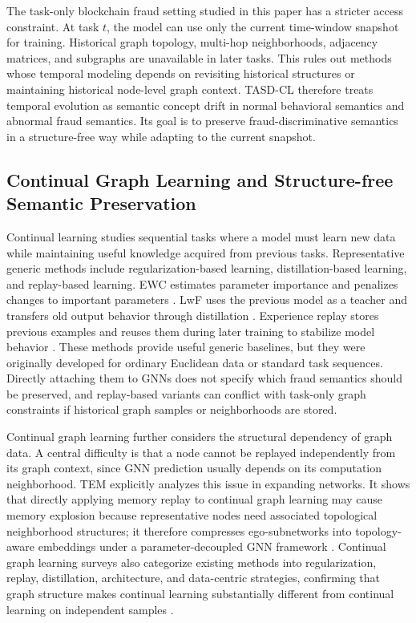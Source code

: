 The task-only blockchain fraud setting studied in this paper has a stricter access constraint. At task $t$, the model can use only the current time-window snapshot for training. Historical graph topology, multi-hop neighborhoods, adjacency matrices, and subgraphs are unavailable in later tasks. This rules out methods whose temporal modeling depends on revisiting historical structures or maintaining historical node-level graph context. TASD-CL therefore treats temporal evolution as semantic concept drift in normal behavioral semantics and abnormal fraud semantics. Its goal is to preserve fraud-discriminative semantics in a structure-free way while adapting to the current snapshot.

\subsection{Continual Graph Learning and Structure-free Semantic Preservation}
\label{subsec:rw-cgl}

Continual learning studies sequential tasks where a model must learn new data while maintaining useful knowledge acquired from previous tasks. Representative generic methods include regularization-based learning, distillation-based learning, and replay-based learning. EWC estimates parameter importance and penalizes changes to important parameters \cite{kirkpatrick2017ewc}. LwF uses the previous model as a teacher and transfers old output behavior through distillation \cite{li2017lwf}. Experience replay stores previous examples and reuses them during later training to stabilize model behavior \cite{robins1995catastrophic}. These methods provide useful generic baselines, but they were originally developed for ordinary Euclidean data or standard task sequences. Directly attaching them to GNNs does not specify which fraud semantics should be preserved, and replay-based variants can conflict with task-only graph constraints if historical graph samples or neighborhoods are stored.

Continual graph learning further considers the structural dependency of graph data. A central difficulty is that a node cannot be replayed independently from its graph context, since GNN prediction usually depends on its computation neighborhood. TEM explicitly analyzes this issue in expanding networks. It shows that directly applying memory replay to continual graph learning may cause memory explosion because representative nodes need associated topological neighborhood structures; it therefore compresses ego-subnetworks into topology-aware embeddings under a parameter-decoupled GNN framework \cite{zhang2024tem}. Continual graph learning surveys also categorize existing methods into regularization, replay, distillation, architecture, and data-centric strategies, confirming that graph structure makes continual learning substantially different from continual learning on independent samples \cite{wang2024cglsurvey}.

